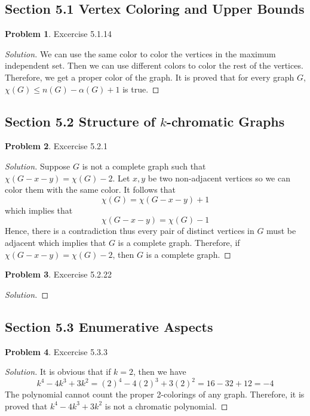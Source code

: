 \documentclass[12pt]{article}
\theoremstyle{definition}
\newtheorem{problem}{Problem}
\newenvironment*{solution}{\begin{proof}[Solution]}{\end{proof}}
\begin{document}
\subsection*{Section 5.1 Vertex Coloring and Upper Bounds}
\begin{problem}
    Excercise 5.1.14
\end{problem}
\begin{solution}
    We can use the same color to color the vertices in the maximum independent
    set.
    Then we can use different colors to color the rest of the vertices.
    Therefore, we get a proper color of the graph.
    It is proved that for every graph \(G\), \(\chi(G) \leq n(G)-\alpha(G)+1\)
    is true.
\end{solution}

\subsection*{Section 5.2 Structure of \(k\)-chromatic Graphs}
\begin{problem}
    Excercise 5.2.1
\end{problem}
\begin{solution}
    Suppose \(G\) is not a complete graph such that
    \(\chi(G-x-y) = \chi(G)-2\).
    Let \(x,y\) be two non-adjacent vertices so we can color them with the
    same color.
    It follows that \[\chi(G) = \chi(G-x-y)+1\] which implies that
    \[\chi(G-x-y) = \chi(G)-1\]
    Hence, there is a contradiction thus every pair of distinct vertices in
    \(G\) must be adjacent which implies that \(G\) is a complete graph.
    Therefore, if \(\chi(G-x-y) = \chi(G)-2\), then \(G\) is a complete graph.
\end{solution}

\begin{problem}
    Excercise 5.2.22
\end{problem}
\begin{solution}
    
\end{solution}

\subsection*{Section 5.3 Enumerative Aspects}
\begin{problem}
    Excercise 5.3.3
\end{problem}
\begin{solution}
    It is obvious that if \(k=2\), then we have
    \[k^4-4k^3+3k^2 = (2)^4-4(2)^3+3(2)^2 = 16-32+12 = -4\]
    The polynomial cannot count the proper 2-colorings of any graph.
    Therefore, it is proved that \(k^4-4k^3+3k^2\) is not a chromatic
    polynomial.
\end{solution}
\end{document}

